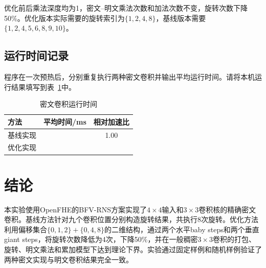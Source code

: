 \documentclass[UTF8,a4paper,12pt]{ctexart}
\begin{document}
优化前后乘法深度均为1，密文--明文乘法次数和加法次数不变，旋转次数下降50\%。优化版本实际需要的旋转索引为$\{1,2,4,8\}$，基线版本需要$\{1,2,4,5,6,8,9,10\}$。

\subsection{运行时间记录}
程序在一次预热后，分别重复执行两种密文卷积并输出平均运行时间。请将本机运行结果填写到表~\ref{tab:time}中。

\begin{table}[H]
\centering
\caption{密文卷积运行时间}
\label{tab:time}
\begin{tabular}{lcc}
\toprule
方法 & 平均时间/ms & 相对加速比\\
\midrule
基线实现 & \underline{\hspace{3cm}} & 1.00\\
优化实现 & \underline{\hspace{3cm}} & \underline{\hspace{2cm}}\\
\bottomrule
\end{tabular}
\end{table}

\section{结论}
本实验使用OpenFHE的BFV-RNS方案实现了$4\times4$输入和$3\times3$卷积核的精确密文卷积。基线方法针对九个卷积位置分别构造旋转结果，共执行8次旋转。优化方法利用偏移集合$\{0,1,2\}+\{0,4,8\}$的二维结构，通过两个水平baby steps和两个垂直giant steps，将旋转次数降低为4次，下降50\%，并在一般稠密$3\times3$卷积的打包、旋转、明文乘法和累加模型下达到理论下界。实验通过固定样例和随机样例验证了两种密文实现与明文卷积结果完全一致。
\end{document}
